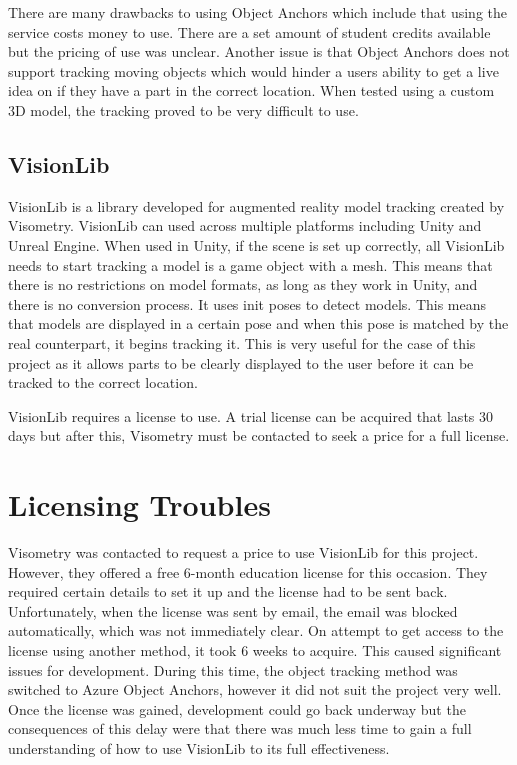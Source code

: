 \documentclass{l4proj}
\begin{document}
There are many drawbacks to using Object Anchors which include that using the service costs money to use. There are a set amount of student credits available but the pricing of use was unclear. Another issue is that Object Anchors does not support tracking moving objects which would hinder a users ability to get a live idea on if they have a part in the correct location. When tested using a custom 3D model, the tracking proved to be very difficult to use.

\subsection{VisionLib}

VisionLib is a library developed for augmented reality model tracking created by Visometry. VisionLib can used across multiple platforms including Unity and Unreal Engine. When used in Unity, if the scene is set up correctly, all VisionLib needs to start tracking a model is a game object with a mesh. This means that there is no restrictions on model formats, as long as they work in Unity, and there is no conversion process. It uses init poses to detect models. This means that models are displayed in a certain pose and when this pose is matched by the real counterpart, it begins tracking it. This is very useful for the case of this project as it allows parts to be clearly displayed to the user before it can be tracked to the correct location. %

VisionLib requires a license to use. A trial license can be acquired that lasts 30 days but after this, Visometry must be contacted to seek a price for a full license.

\section{Licensing Troubles}

Visometry was contacted to request a price to use VisionLib for this project. However, they offered a free 6-month education license for this occasion. They required certain details to set it up and the license had to be sent back. Unfortunately, when the license was sent by email, the email was blocked automatically, which was not immediately clear. On attempt to get access to the license using another method, it took 6 weeks to acquire. This caused significant issues for development. During this time, the object tracking method was switched to Azure Object Anchors, however it did not suit the project very well. Once the license was gained, development could go back underway but the consequences of this delay were that there was much less time to gain a full understanding of how to use VisionLib to its full effectiveness.
\end{document}
